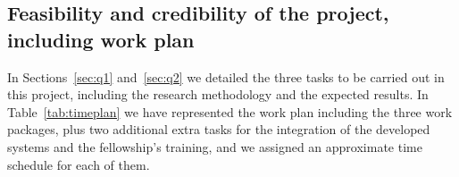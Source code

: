 \subsection{Feasibility and credibility of the project, including work plan} 
In Sections~\ref{sec:q1} and~\ref{sec:q2} we detailed the three tasks to be carried 
out in this project, including the research methodology and the expected results. 
In Table~\ref{tab:timeplan} we have represented the work plan including the three 
work packages, plus two additional extra tasks for the integration of the developed systems
and the fellowship's training, and we assigned an approximate time schedule for each of them.
\begin{table}[h!]
  \begin{Timeplan}
    \hline
    \hline
    \hline
    
    \hline
    \hline
    \hline
    \hline
    
    \hline
    \hline
    \hline
    \hline
    

\end{Timeplan}
\end{table}
